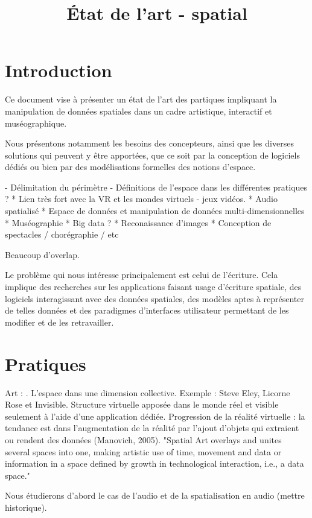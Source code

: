 \documentclass[french,12pt]{article}
\title{État de l'art - spatial}
\begin{document}
\maketitle

\section{Introduction}
Ce document vise à présenter un état de l'art des partiques impliquant la manipulation de 
données spatiales dans un cadre artistique, interactif et muséographique.

Nous présentons notamment les besoins des concepteurs, ainsi que les diverses solutions qui 
peuvent y être apportées, que ce soit par la conception de logiciels dédiés ou bien 
par des modélisations formelles des notions d'espace.
 
 
 - Délimitation du périmètre
 - Définitions de l'espace dans les différentes pratiques ?
  * Lien très fort avec la VR et les mondes virtuels - jeux vidéos.
  * Audio spatialisé
  * Espace de données et manipulation de données multi-dimensionnelles
  * Muséographie
  * Big data ?
  * Reconaissance d'images 
  * Conception de spectacles / chorégraphie / etc

Beaucoup d'overlap.
  
Le problème qui nous intéresse principalement est celui de l'écriture. Cela implique des recherches sur les applications faisant usage d'écriture spatiale, des logiciels interagissant avec des données spatiales, des modèles aptes à représenter de telles données et des paradigmes d'interfaces utilisateur permettant de les modifier et de les retravailler. 



\section{Pratiques}
Art : \cite{lodi_spatial_2014}. L'espace dans une dimension collective. Exemple : Steve Eley, Licorne Rose et Invisible. Structure virtuelle apposée dans le monde réel et visible seulement à l'aide d'une application dédiée. Progression de la réalité virtuelle : la tendance est dans l'augmentation de la réalité par l'ajout d'objets qui extraient ou rendent des données (Manovich, 2005). "Spatial Art overlays and unites several spaces into one, making artistic use of time, movement and data or information in a space defined by growth in technological interaction, i.e., a data space."

Nous étudierons d'abord le cas de l'audio et de la spatialisation en audio (mettre historique).
\end{document}
